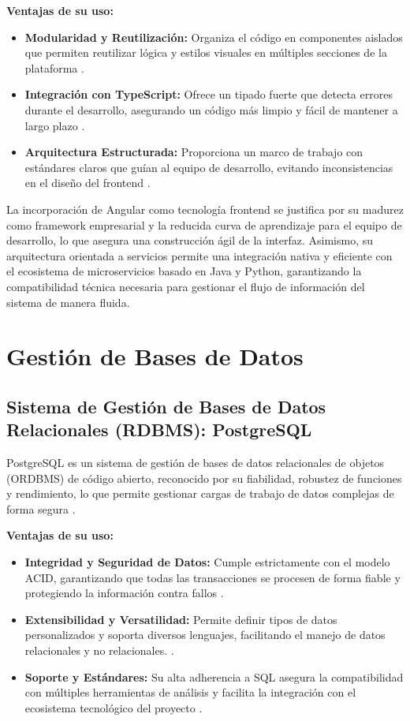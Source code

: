 \textbf{Ventajas de su uso:}
\begin{itemize}
\item \textbf{Modularidad y Reutilización:} Organiza el código en componentes aislados que permiten reutilizar lógica y estilos visuales en múltiples secciones de la plataforma \cite{41} .
\item \textbf{Integración con TypeScript:} Ofrece un tipado fuerte que detecta errores durante el desarrollo, asegurando un código más limpio y fácil de mantener a largo plazo \cite{41} .
\item \textbf{Arquitectura Estructurada:} Proporciona un marco de trabajo con estándares claros que guían al equipo de desarrollo, evitando inconsistencias en el diseño del frontend \cite{41} .
\end{itemize}

La incorporación de Angular como tecnología frontend se justifica por su madurez como framework empresarial y la reducida curva de aprendizaje para el equipo de desarrollo, lo que asegura una construcción ágil de la interfaz. Asimismo, su arquitectura orientada a servicios permite una integración nativa y eficiente con el ecosistema de microservicios basado en Java y Python, garantizando la compatibilidad técnica necesaria para gestionar el flujo de información del sistema de manera fluida.

\section{Gestión de Bases de Datos}
\subsection{Sistema de Gestión de Bases de Datos Relacionales (RDBMS): PostgreSQL}
PostgreSQL es un sistema de gestión de bases de datos relacionales de objetos (ORDBMS) de código abierto, reconocido por su fiabilidad, robustez de funciones y rendimiento, lo que permite gestionar cargas de trabajo de datos complejas de forma segura \cite{42} .

\textbf{Ventajas de su uso:}
\begin{itemize}
\item \textbf{Integridad y Seguridad de Datos:} Cumple estrictamente con el modelo ACID, garantizando que todas las transacciones se procesen de forma fiable y protegiendo la información contra fallos \cite{42} .
\item \textbf{Extensibilidad y Versatilidad:} Permite definir tipos de datos personalizados y soporta diversos lenguajes, facilitando el manejo de datos relacionales y no relacionales. \cite{42} .
\item \textbf{Soporte y Estándares:} Su alta adherencia a SQL asegura la compatibilidad con múltiples herramientas de análisis y facilita la integración con el ecosistema tecnológico del proyecto \cite{42} .
\end{itemize}

